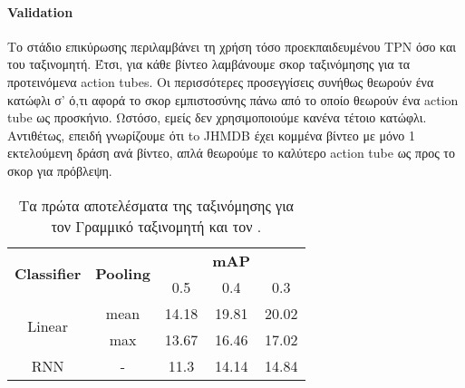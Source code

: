\paragraph{\en Validation\gr} Το στάδιο επικύρωσης περιλαμβάνει τη χρήση τόσο προεκπαιδευμένου \en TPN \gr όσο και του ταξινομητή.
Έτσι, για κάθε βίντεο λαμβάνουμε σκορ ταξινόμησης για τα προτεινόμενα \en action tubes\gr.
Οι περισσότερες προσεγγίσεις συνήθως θεωρούν ένα κατώφλι σ' ό,τι αφορά το σκορ εμπιστοσύνης πάνω από το οποίο θεωρούν ένα \en action tube \gr
 ως προσκήνιο. Ωστόσο, εμείς δεν χρησιμοποιούμε κανένα τέτοιο κατώφλι. Αντιθέτως, επειδή
 γνωρίζουμε ότι to  \en  JHMDB \gr έχει κομμένα βίντεο με μόνο 1 εκτελούμενη δράση ανά βίντεο, απλά θεωρούμε το καλύτερο \en action tube \gr ως προς το σκορ για πρόβλεψη.

 \begin{table}[h]
   \en
  \centering
  \begin{tabular}{|| c | c || c  c  c ||}
    \hline
    \multirow{2}{*}{\textbf{Classifier}} & \multirow{2}{*}{\textbf{Pooling}} &  {} & \textbf{mAP} & {} \\
    {} & {} & 0.5 & 0.4 & 0.3 \\
    \hline
    \multirow{2}{*}{Linear} & mean & 14.18 & 19.81 & 20.02 \\
    \cline{2-5}
    {} & max & 13.67 & 16.46 & 17.02 \\
    \hline
    RNN  & -  & 11.3 & 14.14 & 14.84 \\
    \hline
  \end{tabular}

  \caption{\gr Τα πρώτα αποτελέσματα της ταξινόμησης για τον Γραμμικό ταξινομητή  και τον   .}
  \label{table:gr_rnn_linear}
\end{table}

